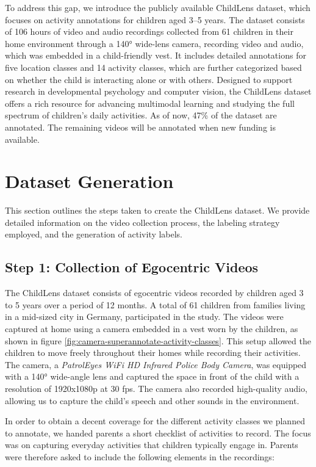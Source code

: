 \documentclass[
  man,floatsintext]{apa6}
\begin{document}
To address this gap, we introduce the publicly available ChildLens dataset, which focuses on activity annotations for children aged 3--5 years. The dataset consists of 106 hours of video and audio recordings collected from 61 children in their home environment through a 140° wide-lens camera, recording video and audio, which was embedded in a child-friendly vest. It includes detailed annotations for five location classes and 14 activity classes, which are further categorized based on whether the child is interacting alone or with others. Designed to support research in developmental psychology and computer vision, the ChildLens dataset offers a rich resource for advancing multimodal learning and studying the full spectrum of children's daily activities. As of now, 47\% of the dataset are annotated. The remaining videos will be annotated when new funding is available.

\section{Dataset Generation}\label{dataset-generation}

This section outlines the steps taken to create the ChildLens dataset. We provide detailed information on the video collection process, the labeling strategy employed, and the generation of activity labels.

\subsection{Step 1: Collection of Egocentric Videos}\label{step-1-collection-of-egocentric-videos}

The ChildLens dataset consists of egocentric videos recorded by children aged 3 to 5 years over a period of 12 months. A total of 61 children from families living in a mid-sized city in Germany, participated in the study. The videos were captured at home using a camera embedded in a vest worn by the children, as shown in figure \ref{fig:camera-superannotate-activity-classes}. This setup allowed the children to move freely throughout their homes while recording their activities. The camera, a \emph{PatrolEyes WiFi HD Infrared Police Body Camera}, was equipped with a 140° wide-angle lens and captured the space in front of the child with a resolution of 1920x1080p at 30 fps. The camera also recorded high-quality audio, allowing us to capture the child's speech and other sounds in the environment.

In order to obtain a decent coverage for the different activity classes we planned to annotate, we handed parents a short checklist of activities to record. The focus was on capturing everyday activities that children typically engage in. Parents were therefore asked to include the following elements in the recordings:
\end{document}
